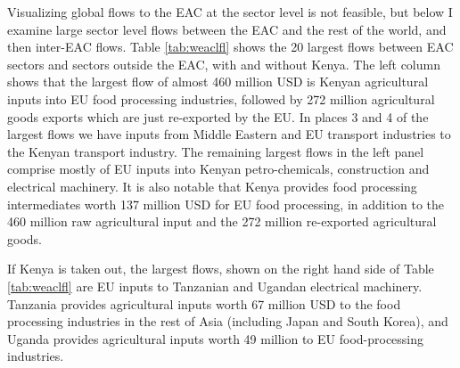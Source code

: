 \documentclass[a4paper]{article}
\begin{document}
Visualizing global flows to the EAC at the sector level is not feasible, but below I examine large sector level flows between the EAC and the rest of the world, and then inter-EAC flows. Table \ref{tab:weaclfl} shows the 20 largest flows between EAC sectors and sectors outside the EAC, with and without Kenya. The left column shows that the largest flow of almost 460 million USD is Kenyan agricultural inputs into EU food processing industries, followed by 272 million agricultural goods exports which are just re-exported by the EU.  In places 3 and 4 of the largest flows we have inputs from Middle Eastern and EU transport industries to the Kenyan transport industry. The remaining largest flows in the left panel comprise mostly of EU inputs into Kenyan petro-chemicals, construction and electrical machinery.  It is also notable that Kenya provides food processing intermediates worth 137 million USD for EU food processing, in addition to the 460 million raw agricultural input and the 272 million re-exported agricultural goods. \newline

If Kenya is taken out, the largest flows, shown on the right hand side of Table \ref{tab:weaclfl} are EU inputs to Tanzanian and Ugandan electrical machinery. Tanzania provides agricultural inputs worth 67 million USD to the food processing industries in the rest of Asia (including Japan and South Korea), and Uganda provides agricultural inputs worth 49 million to EU food-processing industries.  
\end{document}
